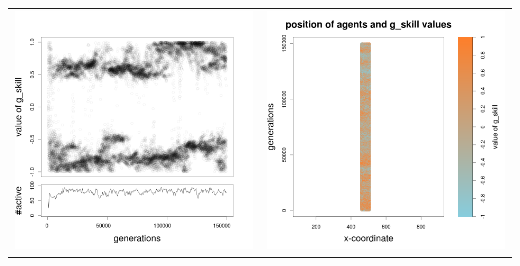 \documentclass[a4paper,10pt]{article}
\begin{document}
\begin{table}[H]
\begin{tabular}{cc}
\newline
\includegraphics[width=\imgSize]{../images/5StaticEnv/Gplot47_staticEnv0}&\includegraphics[width=\imgSize]{../images/5StaticEnv/Gplot47Static_staticEnv0}\\
\end{tabular}
\end{table}
\end{document}
